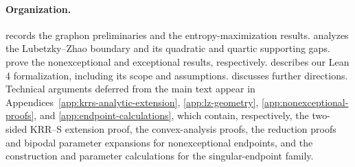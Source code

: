 \paragraph{Organization.}
 records the graphon preliminaries and the
entropy-maximization results.   analyzes the Lubetzky--Zhao
boundary and its quadratic and quartic supporting gaps.
prove the nonexceptional and exceptional results, respectively.
 describes our Lean 4 formalization,
including its scope and assumptions.
 discusses further directions.
Technical arguments deferred from the main text
appear in Appendices~\ref{app:krrs-analytic-extension}, \ref{app:lz-geometry},
\ref{app:nonexceptional-proofs}, and
\ref{app:endpoint-calculations}, which contain, respectively, the
two-sided KRR--S extension proof, the convex-analysis proofs,
the reduction proofs and bipodal parameter expansions for nonexceptional endpoints,
and the construction and parameter calculations for the singular-endpoint family.
